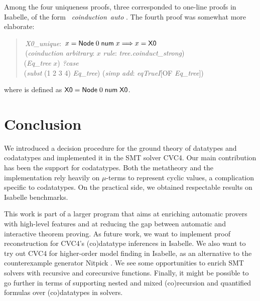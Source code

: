 Among the four uniqueness proofs, three corresponded to one-line
proofs in Isabelle, of the form ~\textit{coinduction}~\textit{auto}
\cite{blanchette-et-al-2014-impl}. The fourth proof was somewhat more elaborate:
%
\begin{quote}
 \,\textit{X0\_unique}: \,$x = \textsf{Node}\;0\;\textsf{num}\; x \Longrightarrow x = \textsf{X0}$ \\
 \,(\textit{coinduction arbitrary}: $x$ \textit{rule}: \textit{tree.coinduct\_strong}) \\
\noindent\hbox{}\quad  {} (\textit{Eq\_tree} $x$)  \textit{?case} \\
\noindent\hbox{}\qquad  {} (\textit{subst} (1 2 3 4) \textit{Eq\_tree}) (\textit{simp add}: \textit{eqTrueI}[OF \textit{Eq\_tree}]) \\
\end{quote}
%
\noindent
where  is defined as $\textsf{X0} =
\textsf{Node}\;0\;\textsf{num}\;\textsf{X0}$.

\section{Conclusion}
\label{sec:conclusion}

We introduced a decision procedure for the ground theory of datatypes and
codatatypes and implemented it in the SMT solver CVC4. Our main
contribution has been the support for codatatypes. Both the metatheory and
the implementation rely heavily on $\mu$-terms to represent cyclic values,
a complication specific to codatatypes.
On the practical side, we obtained respectable results on Isabelle benchmarks.

This work is part of a larger program that aims at enriching automatic provers
with high-level features and at reducing the gap between automatic and
interactive theorem proving. As future work, we want to implement proof
reconstruction for CVC4's (co)datatype inferences in Isabelle. We also want to
try out CVC4 for higher-order model finding in Isabelle, as an alternative to
the counterexample generator Nitpick \cite{blanchette-nipkow-2010}. We
see some opportunities to enrich SMT solvers with recursive and corecursive
functions. Finally, it might be possible to go further in terms of supporting
nested and mixed (co)recursion and quantified formulas over (co)datatypes in
solvers.

